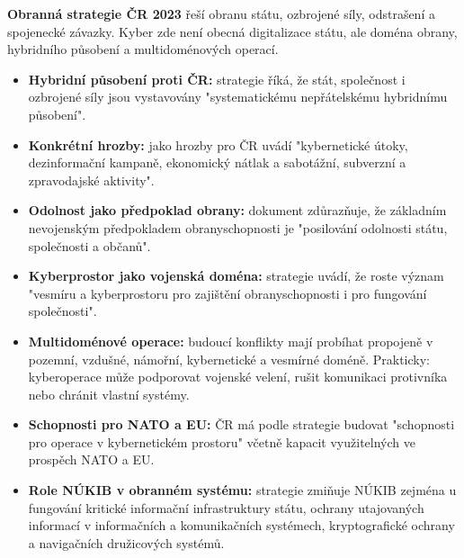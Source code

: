 \documentclass[11pt,a4paper]{article}
\begin{document}
\textbf{Obranná strategie ČR 2023} řeší obranu státu, ozbrojené síly, odstrašení a spojenecké závazky. Kyber zde není obecná digitalizace státu, ale doména obrany, hybridního působení a multidoménových operací.
\begin{itemize}
  \item \textbf{Hybridní působení proti ČR:} strategie říká, že stát, společnost i ozbrojené síly jsou vystavovány "systematickému nepřátelskému hybridnímu působení".
  \item \textbf{Konkrétní hrozby:} jako hrozby pro ČR uvádí "kybernetické útoky, dezinformační kampaně, ekonomický nátlak a sabotážní, subverzní a zpravodajské aktivity".
  \item \textbf{Odolnost jako předpoklad obrany:} dokument zdůrazňuje, že základním nevojenským předpokladem obranyschopnosti je "posilování odolnosti státu, společnosti a občanů".
  \item \textbf{Kyberprostor jako vojenská doména:} strategie uvádí, že roste význam "vesmíru a kyberprostoru pro zajištění obranyschopnosti i pro fungování společnosti".
  \item \textbf{Multidoménové operace:} budoucí konflikty mají probíhat propojeně v pozemní, vzdušné, námořní, kybernetické a vesmírné doméně. Prakticky: kyberoperace může podporovat vojenské velení, rušit komunikaci protivníka nebo chránit vlastní systémy.
  \item \textbf{Schopnosti pro NATO a EU:} ČR má podle strategie budovat "schopnosti pro operace v kybernetickém prostoru" včetně kapacit využitelných ve prospěch NATO a EU.
  \item \textbf{Role NÚKIB v obranném systému:} strategie zmiňuje NÚKIB zejména u fungování kritické informační infrastruktury státu, ochrany utajovaných informací v informačních a komunikačních systémech, kryptografické ochrany a navigačních družicových systémů.
\end{itemize}
\end{document}
